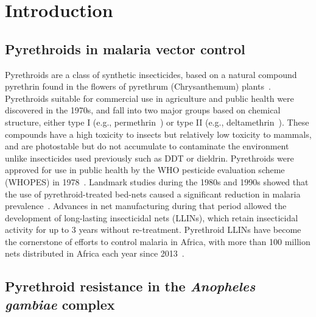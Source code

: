 \documentclass[a4paper,11pt,abstracton,hidelinks]{scrartcl}
\begin{document}
\section{Introduction}\label{sec:introduction}


\subsection{Pyrethroids in malaria vector control}\label{subsec:intro-pyrethroid-llins}


Pyrethroids are a class of synthetic insecticides, based on a natural compound pyrethrin found in the flowers of pyrethrum (Chrysanthemum) plants~\parencite{Elliott1989}.
%
Pyrethroids suitable for commercial use in agriculture and public health were discovered in the 1970s, and fall into two major groups based on chemical structure, either type I (e.g., permethrin~\parencite{Elliott1973}) or type II (e.g., deltamethrin~\parencite{Elliott1974}).
%
These compounds have a high toxicity to insects but relatively low toxicity to mammals, and are photostable but do not accumulate to contaminate the environment unlike insecticides used previously such as DDT or dieldrin.
%
Pyrethroids were approved for use in public health by the WHO pesticide evaluation scheme (WHOPES) in 1978~\parencite{Quelennec1988}.
%
Landmark studies during the 1980s and 1990s showed that the use of pyrethroid-treated bed-nets caused a significant reduction in malaria prevalence~\parencite{Carnevale2019}.
%
Advances in net manufacturing during that period allowed the development of long-lasting insecticidal nets (LLINs), which retain insecticidal activity for up to 3 years without re-treatment.
%
Pyrethroid LLINs have become the cornerstone of efforts to control malaria in Africa, with more than 100 million nets distributed in Africa each year since 2013~\parencite{Bhatt2015,AMP2020}.


\subsection{Pyrethroid resistance in the \textit{Anopheles gambiae} complex}\label{subsec:intro-pyrethroid-resistance}
\end{document}
